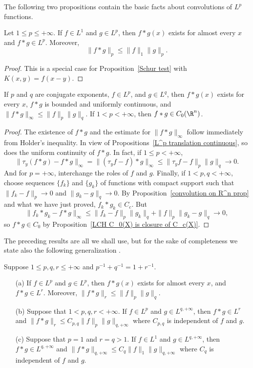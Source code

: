 The following two propositions contain the basic facts about convolutions of $L^p$ functions.
\begin{proposition}
Let $1\leq p\leq+\infty$. If $f\in L^1$ and $g\in L^p$, then $f\ast g(x)$ exists for almost every $x$ and $f\ast g\in L^p$. Moreover,
\[\|f\ast g\|_p\leq\|f\|_1\|g\|_p.\]
\end{proposition}
\begin{proof}
This is a special case for Proposition~\ref{Schur test} with $K(x,y)=f(x-y)$.
\end{proof}
\begin{proposition}
If $p$ and $q$ are conjugate exponents, $f\in L^p$, and $g\in L^q$, then $f\ast g(x)$ exists for every $x$, $f\ast g$ is bounded and uniformly continuous, and $\|f\ast g\|_{\infty}\leq\|f\|_p\|g\|_q$. If $1<p<+\infty$, then $f\ast g\in C_0(\R^n)$.
\end{proposition}
\begin{proof}
The existence of $f\ast g$ and the estimate for $\|f\ast g\|_{\infty}$ follow immediately from Holder's inequality. In view of Propositions~\ref{L^p translation continuous}, so does the uniform continuity of $f\ast g$. In fact, if $1\leq p<+\infty$,
\[\|\tau_y(f\ast g)-f\ast g\|_{\infty}=\|(\tau_yf-f)\ast g\|_{\infty}\leq\|\tau_yf-f\|_p\|g\|_q\to 0.\]
And for $p=+\infty$, interchange the roles of $f$ and $g$. Finally, if $1<p,q<+\infty$, choose sequences $\{f_k\}$ and $\{g_k\}$ of functions with compact support such that $\|f_k-f\|_p\to 0$ and $\|g_k-g\|_q\to 0$. By Proposition~\ref{convolution on R^n prop} and what we have just proved, $f_k\ast g_k\in C_c$. But
\[\|f_k\ast g_k-f\ast g\|_\infty\leq\|f_k-f\|_p\|g_k\|_q+\|f\|_p\|g_k-g\|_q\to 0,\]
so $f\ast g\in C_0$ by Proposition~\ref{LCH C_0(X) is closure of C_c(X)}.
\end{proof}
The preceding results are all we shall use, but for the sake of completeness we state also the following generalization .
\begin{proposition}
Suppose $1\leq p,q,r\leq+\infty$ and $p^{-1}+q^{-1}=1+r^{-1}$.
\begin{itemize}
\item[(a)] If $f\in L^p$ and $g\in L^p$, then $f\ast g(x)$ exists for almost every $x$, and $f\ast g\in L^r$. Moreover, $\|f\ast g\|_r\leq\|f\|_p\|g\|_q$.
\item[(b)] Suppose that $1<p,q,r<+\infty$. If $f\in L^p$ and $g\in L^{q,+\infty}$, then $f\ast g\in L^r$ and $\|f\ast g\|_r\leq C_{p,q}\|f\|_p\|g\|_{q,+\infty}$ where $C_{p,q}$ is independent of $f$ and $g$.
\item[(c)] Suppose that $p=1$ and $r=q>1$. If $f\in L^1$ and $g\in L^{q,+\infty}$, then $f\ast g\in L^{q,+\infty}$ and $\|f\ast g\|_{q,+\infty}\leq C_q\|f\|_1\|g\|_{q,+\infty}$ where $C_q$ is independent of $f$ and $g$. 
\end{itemize}
\end{proposition}
